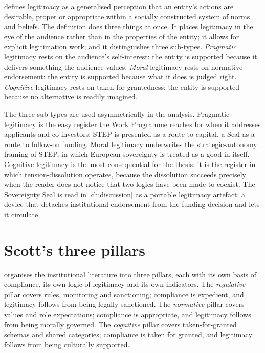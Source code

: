\textcite{suchman1995managing} defines legitimacy as a generalised
perception that an entity's actions are desirable, proper or
appropriate within a socially constructed system of norms and beliefs.
The definition does three things at once. It places legitimacy in the
eye of the audience rather than in the properties of the entity; it
allows for explicit legitimation work; and it distinguishes three
sub-types. \emph{Pragmatic} legitimacy rests on the audience's
self-interest: the entity is supported because it delivers something
the audience values. \emph{Moral} legitimacy rests on normative
endorsement: the entity is supported because what it does is judged
right. \emph{Cognitive} legitimacy rests on taken-for-grantedness: the
entity is supported because no alternative is readily imagined.

The three sub-types are used asymmetrically in the analysis. Pragmatic
legitimacy is the easy register the Work Programme reaches for when it
addresses applicants and co-investors: STEP is presented as a route to
capital, a Seal as a route to follow-on funding. Moral legitimacy
underwrites the strategic-autonomy framing of STEP, in which European
sovereignty is treated as a good in itself. Cognitive legitimacy is
the most consequential for the thesis: it is the register in which
tension-dissolution operates, because the dissolution succeeds
precisely when the reader does not notice that two logics have been
made to coexist. The Sovereignty Seal is read in \cref{ch:discussion}
as a portable legitimacy artefact: a device that detaches institutional
endorsement from the funding decision and lets it circulate.

\section{Scott's three pillars}
\label{sec:bg-it-scott}

\textcite{scott2014institutions} organises the institutional
literature into three pillars, each with its own basis of compliance,
its own logic of legitimacy and its own indicators. The
\emph{regulative} pillar covers rules, monitoring and sanctioning;
compliance is expedient, and legitimacy follows from being legally
sanctioned. The \emph{normative} pillar covers values and role
expectations; compliance is appropriate, and legitimacy follows from
being morally governed. The \emph{cognitive} pillar covers taken-for-granted
schemas and shared categories; compliance is taken for granted, and
legitimacy follows from being culturally supported.

